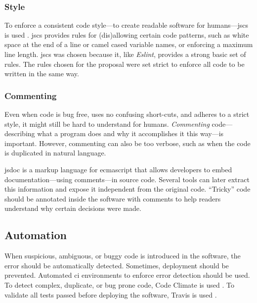 \subsubsection{Style}\label{style}

To enforce a consistent code style---to create readable software for
  humans---\acrshort{jscs} is used \autocite{mdevils/node-jscs-source-code}.
\acrshort{jscs} provides rules for (dis)allowing certain code patterns,
  such as white space at the end of a line or camel cased variable names,
  or enforcing a maximum line length.
\acrshort{jscs} was chosen because it, like \emph{Eslint}, provides a strong
  basic set of rules.
The rules chosen for the proposal were set strict to enforce all code to be
  written in the same way.

\subsubsection{Commenting}\label{commenting}

Even when code is bug free, uses no confusing short-cuts, and adheres to a
  strict style, it might still be hard to understand for humans.
\emph{Commenting} code---describing what a program does and why it
  accomplishes it this way---is important.
However, commenting can also be too verbose, such as when the code is
  duplicated in natural language.

\gls{jsdoc} \autocite{google.com-clojure-compiler-jsdoc} is a markup language
  for \gls{ecmascript} that allows developers to embed documentation---using
  comments---in source code.
Several tools can later extract this information and expose it independent
  from the original code.
``Tricky'' code should be annotated inside the software with comments to help
  readers understand why certain decisions were made.

\subsection{Automation}\label{automation}

When suspicious, ambiguous, or buggy code is introduced in the software, the
  error should be automatically detected.
Sometimes, deployment should be prevented.
Automated \gls{ci} environments to enforce error detection should be used.
To detect complex, duplicate, or bug prone code, Code Climate is used
  \autocite{codeclimate.com}.
To validate all tests passed before deploying the software, Travis is used
  \autocite{travis-ci.org}.

